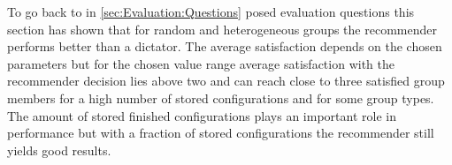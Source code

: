 To go back to in \autoref{sec:Evaluation:Questions} posed evaluation questions this section has shown that for random and heterogeneous groups the recommender performs better than a dictator. The average satisfaction depends on the chosen parameters but for the chosen value range average satisfaction with the recommender decision lies above two and can reach close to three satisfied group members for a high number of stored configurations and for some group types. The amount of stored finished configurations plays an important role in performance but with a fraction of stored configurations the recommender still yields good results. 

